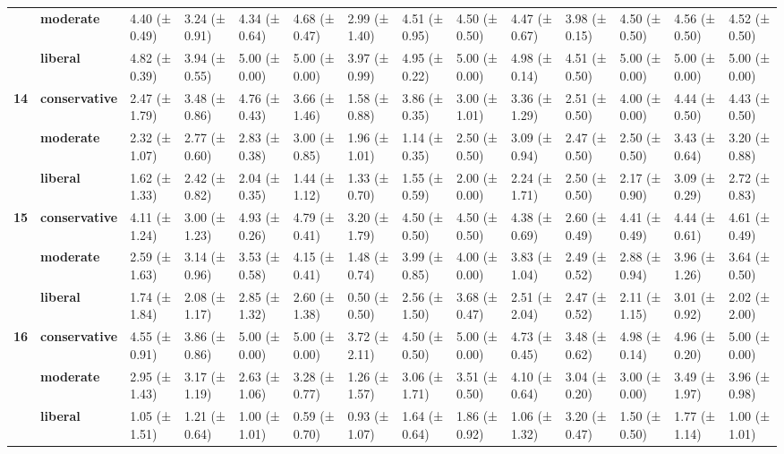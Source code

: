 \begin{longtable}{llllllllllllll}
\textbf{} & \textbf{moderate} & 4.40 (± 0.49) & 3.24 (± 0.91) & 4.34 (± 0.64) & 4.68 (± 0.47) & 2.99 (± 1.40) & 4.51 (± 0.95) & 4.50 (± 0.50) & 4.47 (± 0.67) & 3.98 (± 0.15) & 4.50 (± 0.50) & 4.56 (± 0.50) & 4.52 (± 0.50) \\
\textbf{} & \textbf{liberal} & 4.82 (± 0.39) & 3.94 (± 0.55) & 5.00 (± 0.00) & 5.00 (± 0.00) & 3.97 (± 0.99) & 4.95 (± 0.22) & 5.00 (± 0.00) & 4.98 (± 0.14) & 4.51 (± 0.50) & 5.00 (± 0.00) & 5.00 (± 0.00) & 5.00 (± 0.00) \\
\cline{1-14}
\multirow[t]{3}{*}{\textbf{14}} & \textbf{conservative} & 2.47 (± 1.79) & 3.48 (± 0.86) & 4.76 (± 0.43) & 3.66 (± 1.46) & 1.58 (± 0.88) & 3.86 (± 0.35) & 3.00 (± 1.01) & 3.36 (± 1.29) & 2.51 (± 0.50) & 4.00 (± 0.00) & 4.44 (± 0.50) & 4.43 (± 0.50) \\
\textbf{} & \textbf{moderate} & 2.32 (± 1.07) & 2.77 (± 0.60) & 2.83 (± 0.38) & 3.00 (± 0.85) & 1.96 (± 1.01) & 1.14 (± 0.35) & 2.50 (± 0.50) & 3.09 (± 0.94) & 2.47 (± 0.50) & 2.50 (± 0.50) & 3.43 (± 0.64) & 3.20 (± 0.88) \\
\textbf{} & \textbf{liberal} & 1.62 (± 1.33) & 2.42 (± 0.82) & 2.04 (± 0.35) & 1.44 (± 1.12) & 1.33 (± 0.70) & 1.55 (± 0.59) & 2.00 (± 0.00) & 2.24 (± 1.71) & 2.50 (± 0.50) & 2.17 (± 0.90) & 3.09 (± 0.29) & 2.72 (± 0.83) \\
\cline{1-14}
\multirow[t]{3}{*}{\textbf{15}} & \textbf{conservative} & 4.11 (± 1.24) & 3.00 (± 1.23) & 4.93 (± 0.26) & 4.79 (± 0.41) & 3.20 (± 1.79) & 4.50 (± 0.50) & 4.50 (± 0.50) & 4.38 (± 0.69) & 2.60 (± 0.49) & 4.41 (± 0.49) & 4.44 (± 0.61) & 4.61 (± 0.49) \\
\textbf{} & \textbf{moderate} & 2.59 (± 1.63) & 3.14 (± 0.96) & 3.53 (± 0.58) & 4.15 (± 0.41) & 1.48 (± 0.74) & 3.99 (± 0.85) & 4.00 (± 0.00) & 3.83 (± 1.04) & 2.49 (± 0.52) & 2.88 (± 0.94) & 3.96 (± 1.26) & 3.64 (± 0.50) \\
\textbf{} & \textbf{liberal} & 1.74 (± 1.84) & 2.08 (± 1.17) & 2.85 (± 1.32) & 2.60 (± 1.38) & 0.50 (± 0.50) & 2.56 (± 1.50) & 3.68 (± 0.47) & 2.51 (± 2.04) & 2.47 (± 0.52) & 2.11 (± 1.15) & 3.01 (± 0.92) & 2.02 (± 2.00) \\
\cline{1-14}
\multirow[t]{3}{*}{\textbf{16}} & \textbf{conservative} & 4.55 (± 0.91) & 3.86 (± 0.86) & 5.00 (± 0.00) & 5.00 (± 0.00) & 3.72 (± 2.11) & 4.50 (± 0.50) & 5.00 (± 0.00) & 4.73 (± 0.45) & 3.48 (± 0.62) & 4.98 (± 0.14) & 4.96 (± 0.20) & 5.00 (± 0.00) \\
\textbf{} & \textbf{moderate} & 2.95 (± 1.43) & 3.17 (± 1.19) & 2.63 (± 1.06) & 3.28 (± 0.77) & 1.26 (± 1.57) & 3.06 (± 1.71) & 3.51 (± 0.50) & 4.10 (± 0.64) & 3.04 (± 0.20) & 3.00 (± 0.00) & 3.49 (± 1.97) & 3.96 (± 0.98) \\
\textbf{} & \textbf{liberal} & 1.05 (± 1.51) & 1.21 (± 0.64) & 1.00 (± 1.01) & 0.59 (± 0.70) & 0.93 (± 1.07) & 1.64 (± 0.64) & 1.86 (± 0.92) & 1.06 (± 1.32) & 3.20 (± 0.47) & 1.50 (± 0.50) & 1.77 (± 1.14) & 1.00 (± 1.01) \\
\cline{1-14}
\end{longtable}

